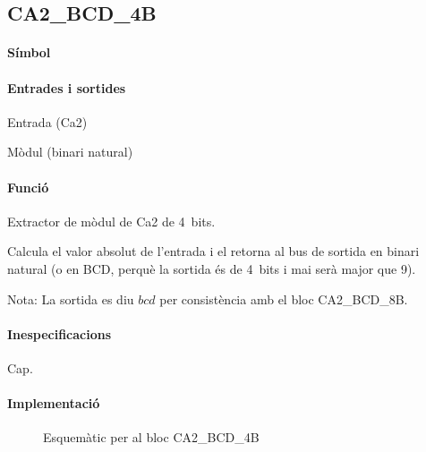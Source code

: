 \subsection{\label{sub:\projectname-CA2_BCD_4B} \textsf{CA2\_BCD\_4B}}

\paragraph{Símbol}
\begin{center}  \end{center}

\paragraph{Entrades i sortides}

\begin{where}
\item[\nodenamerange{x}{3}{0}] Entrada (Ca2)
\item[\nodenamerange{bcd}{3}{0}] Mòdul (binari natural)
\end{where}

\paragraph{Funció}

Extractor de mòdul de Ca2 de 4~bits.

Calcula el valor absolut de l'entrada i el retorna al
bus de sortida en binari natural (o en BCD, perquè la sortida és de 4~bits i
mai serà major que 9).

Nota: La sortida es diu $bcd$ per consistència amb el bloc \textsf{CA2\_BCD\_8B}.

\paragraph{Inespecificacions}

Cap.

\paragraph{Implementació}

\begin{figure}[b]
  \begin{center}
  \end{center}
  \caption{\label{fig:\projectname-CA2_BCD_4B} Esquemàtic per al bloc \textsf{CA2\_BCD\_4B}}
\end{figure}

